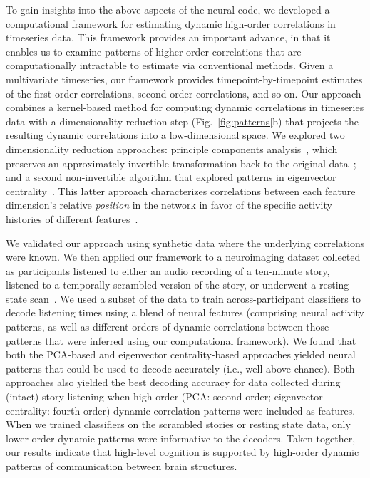 \documentclass[english]{article}
\begin{document}
To gain insights into the above aspects of the neural code, we
developed a computational framework for estimating dynamic high-order
correlations in timeseries data. This framework provides an important
advance, in that it enables us to examine patterns of higher-order
correlations that are computationally intractable to estimate via
conventional methods.  Given a multivariate timeseries, our framework
provides timepoint-by-timepoint estimates of the first-order
correlations, second-order correlations, and so on.  Our approach
combines a kernel-based method for computing dynamic correlations in
timeseries data with a dimensionality reduction step
(Fig.~\ref{fig:patterns}b) that projects the resulting dynamic
correlations into a low-dimensional space.  We explored two
dimensionality reduction approaches: principle components
analysis~\citep[PCA;][]{Pear01}, which preserves an approximately
invertible transformation back to the original data~\citep[e.g., this
follows related approaches taken by][]{McInJirs19, TokeSomm19,
  GonzEtal19}; and a second non-invertible algorithm that explored
patterns in eigenvector centrality~\citep{Land95}.  This latter
approach characterizes correlations between each feature dimension's
relative \textit{position} in the network in favor of the specific
activity histories of different features~\citep[also
see][]{BetzEtal19, SizeEtal18, ReimEtal17}.

We validated our approach using synthetic data where the underlying
correlations were known.  We then applied our framework to a
neuroimaging dataset collected as participants listened to either an
audio recording of a ten-minute story, listened to a temporally scrambled
version of the story, or underwent a resting state
scan~\citep{SimoEtal16}.  We used a subset of the data to train
across-participant classifiers to decode listening times using a blend
of neural features (comprising neural activity patterns, as well as
different orders of dynamic correlations between those patterns that
were inferred using our computational framework).  We found that both
the PCA-based and eigenvector centrality-based approaches yielded
neural patterns that could be used to decode accurately (i.e., well above
chance).  Both approaches also yielded the best decoding accuracy for
data collected during (intact) story listening when high-order (PCA:
second-order; eigenvector centrality: fourth-order) dynamic
correlation patterns were included as features.  When we trained
classifiers on the scrambled stories or resting state data, only
lower-order dynamic patterns were informative to the decoders.  Taken
together, our results indicate that high-level cognition is supported
by high-order dynamic patterns of communication between brain
structures.
\end{document}
